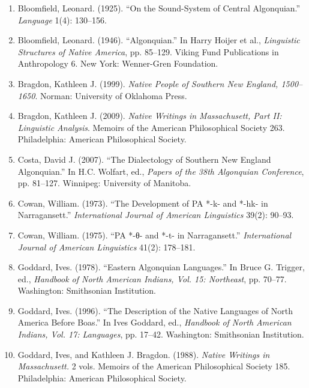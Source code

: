 \begin{enumerate}

\item Bloomfield, Leonard. (1925). ``On the Sound-System of Central
Algonquian.'' \emph{Language} 1(4): 130--156.

\item Bloomfield, Leonard. (1946). ``Algonquian.'' In Harry Hoijer et al.,
\emph{Linguistic Structures of Native America}, pp. 85--129. Viking Fund
Publications in Anthropology 6. New York: Wenner-Gren Foundation.

\item Bragdon, Kathleen J. (1999). \emph{Native People of Southern New
England, 1500--1650}. Norman: University of Oklahoma Press.

\item Bragdon, Kathleen J. (2009). \emph{Native Writings in Massachusett,
Part II: Linguistic Analysis}. Memoirs of the American Philosophical Society
263. Philadelphia: American Philosophical Society.

\item Costa, David J. (2007). ``The Dialectology of Southern New England
Algonquian.'' In H.C. Wolfart, ed., \emph{Papers of the 38th Algonquian
Conference}, pp. 81--127. Winnipeg: University of Manitoba.

\item Cowan, William. (1973). ``The Development of PA *-k- and *-hk- in
Narragansett.'' \emph{International Journal of American Linguistics} 39(2):
90--93.

\item Cowan, William. (1975). ``PA *-θ- and *-t- in Narragansett.''
\emph{International Journal of American Linguistics} 41(2): 178--181.

\item Goddard, Ives. (1978). ``Eastern Algonquian Languages.'' In Bruce G.
Trigger, ed., \emph{Handbook of North American Indians, Vol. 15: Northeast},
pp. 70--77. Washington: Smithsonian Institution.

\item Goddard, Ives. (1996). ``The Description of the Native Languages of
North America Before Boas.'' In Ives Goddard, ed., \emph{Handbook of North
American Indians, Vol. 17: Languages}, pp. 17--42. Washington: Smithsonian
Institution.

\item Goddard, Ives, and Kathleen J. Bragdon. (1988). \emph{Native Writings
in Massachusett.} 2 vols. Memoirs of the American Philosophical Society 185.
Philadelphia: American Philosophical Society.


\end{enumerate}
